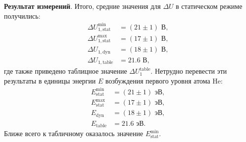 \textbf{Результат измерений}. Итого, средние значения для $\Delta U$ в статическом режиме получились:
\begin{align*}
    \Delta U_{1, \text{stat}}^{\text{min}} &= (21 \pm 1) \text{ В}, \\
    \Delta U_{1, \text{stat}}^{\text{max}} &= (17 \pm 1) \text{ В}, \\
    \Delta U_{1, \text{dyn}} &= (18 \pm 1) \text{ В}, \\
    \Delta U_{1, \text{table}} &= 21.6 \text{ В},
\end{align*}
где также приведено таблицное значение $\Delta U_1^{\text{table}}$. Нетрудно перевести эти результаты в единицы энергии $E$ возбуждения первого уровня атома He:
\begin{align*}
    E_{\text{stat}}^{\text{min}} &= (21 \pm 1) \text{ эВ}, \\
    E_{\text{stat}}^{\text{max}} &= (17 \pm 1) \text{ эВ}, \\
    E_{\text{dyn}} &= (18 \pm 1) \text{ эВ}, \\
    E_{\text{table}} &= 21.6 \text{ эВ}.
\end{align*}
Ближе всего к табличному оказалось значение $E_{\text{stat}}^{\text{min}}$. 